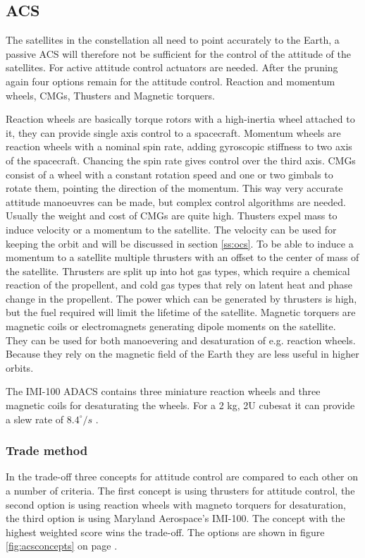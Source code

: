 \subsection{\ac{ACS}}
\label{ss:acs}
The satellites in the constellation all need to point accurately to the Earth, a passive \ac{ACS} will therefore not be sufficient for the control of the attitude of the satellites. For active attitude control actuators are needed. After the pruning again four options remain for the attitude control. Reaction and momentum wheels, \acp{CMG}, Thusters and Magnetic torquers.

Reaction wheels are basically torque rotors with a high-inertia wheel attached to it, they can provide single axis control to a spacecraft. Momentum wheels are reaction wheels with a nominal spin rate, adding gyroscopic stiffness to two axis of the spacecraft. Chancing the spin rate gives control over the third axis.
\acp{CMG} consist of a wheel with a constant rotation speed and one or two gimbals to rotate them, pointing the direction of the momentum. This way very accurate attitude manoeuvres can be made, but complex control algorithms are needed. Usually the weight and cost of \acp{CMG} are quite high.
Thusters expel mass to induce velocity or a momentum to the satellite. The velocity can be used for keeping the orbit and will be discussed in section \ref{ss:ocs}. To be able to induce a momentum to a satellite multiple thrusters with an offset to the center of mass of the satellite. Thrusters are split up into hot gas types, which require a chemical reaction of the propellent, and cold gas types that rely on latent heat and phase change in the propellent. The power which can be generated by thrusters is high, but the fuel required will limit the lifetime of the satellite.
Magnetic torquers are magnetic coils or electromagnets generating dipole moments on the satellite. They can be used for both manoevering and desaturation of e.g. reaction wheels. Because they rely on the magnetic field of the Earth they are less useful in higher orbits.

The IMI-100 ADACS contains three miniature reaction wheels and three magnetic coils for desaturating the wheels. For a 2 kg, 2U cubesat it can provide a slew rate of $8.4^\circ/s$ \cite{imi100}.

\subsubsection{Trade method}
In the trade-off three concepts for attitude control are compared to each other on a number of criteria. The first concept is using thrusters for attitude control, the second option is using reaction wheels with magneto torquers for desaturation, the third option is using Maryland Aerospace's IMI-100. The concept with the highest weighted score wins the trade-off. The options are shown in figure \ref{fig:acsconcepts} on page \pageref{fig:acsconcepts}.

